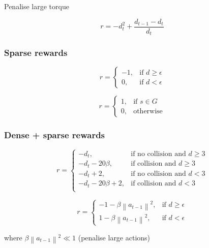 \documentclass{article}
\newcommand{\norm}[1]{\left\lVert#1\right\rVert}
\begin{document}
Penalise large torque

\begin{equation}
r = - d_t^2+ \frac{d_{t-1} - d_t}{d_t}
\end{equation}

\subsubsection{Sparse rewards}

\begin{equation}
r = \begin{cases}
    -1, & \text{if $d \geq \epsilon $}\\
    0, & \text{if $d < \epsilon $}
  \end{cases}
\end{equation}

\begin{equation}
r = \begin{cases}
    1, & \text{if $s \in G $}\\
    0, & \text{otherwise}
  \end{cases}
\end{equation}


\subsubsection{Dense + sparse rewards}

\begin{equation}
r = \begin{cases}
    -d_t, & \text{if no collision and $d \geq 3$}\\
    -d_t - 20\beta , & \text{if collision and $d \geq 3$}\\
    -d_t + 2 , & \text{if no collision and $d < 3$} \\
    -d_t - 20\beta + 2, & \text{if collision and $d < 3$}\\
  \end{cases}
\end{equation}

\begin{equation}
r = \begin{cases}
    - 1 - \beta \norm{a_{t-1}}^2, & \text{if $d \geq \epsilon $}\\
    1 - \beta \norm{a_{t-1}}^2, & \text{if $d < \epsilon $}
  \end{cases}
\end{equation}

where $\beta \norm{a_{t-1}}^2 \ll 1$ (penalise large actions)
\end{document}
